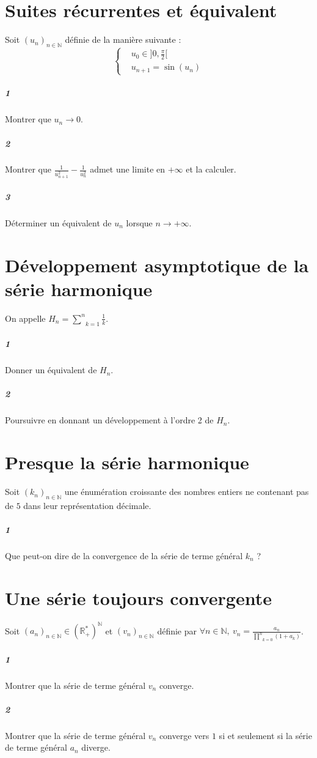 \documentclass[10pt,a4paper]{article}
\begin{document}
\section{Suites récurrentes et équivalent}
Soit $(u_n)_{n \in \mathbb{N}}$ définie de la manière suivante :
\begin{equation*}
\left\lbrace
\begin{aligned}
& u_0 \in ]0,\frac{\pi}{2}[\\
& u_{n+1}=\sin(u_n)
\end{aligned}
\right.
\end{equation*}
\subparagraph{1}Montrer que $u_n \rightarrow 0$.
\subparagraph{2}Montrer que $\frac{1}{u_{n+1}^2}-\frac{1}{u_n^2}$ admet une limite en $+\infty$ et la calculer.
\subparagraph{3}Déterminer un équivalent de $u_n$ lorsque $n \rightarrow +\infty$.

\section{Développement asymptotique de la série harmonique}
On appelle $H_n= \underset{k=1}{\overset{n}{\sum}}\frac{1}{k}$.
\subparagraph{1}Donner un équivalent de $H_n$.
\subparagraph{2}Poursuivre en donnant un développement à l'ordre 2 de $H_n$.

\section{Presque la série harmonique}
Soit $(k_n)_{n \in \mathbb{N}}$ une énumération croissante des nombres entiers ne contenant pas de $5$ dans leur représentation décimale.
\subparagraph{1}Que peut-on dire de la convergence de la série de terme général $k_n$ ?

\section{Une série toujours convergente}
Soit $(a_n)_{n \in \mathbb{N}} \in \left(\mathbb{R}_+^* \right)^{\mathbb{N}}$ et $(v_n)_{n \in \mathbb{N}}$ définie par ${ \forall n \in \mathbb{N}, \ v_n = \frac{a_n}{\underset{k=0}{\overset{n}{\prod}}(1+a_k)}}$.
\subparagraph{1}Montrer que la série de terme général $v_n$ converge.
\subparagraph{2}Montrer que la série de terme général $v_n$ converge vers $1$ si et seulement si la série de terme général $a_n$ diverge.
\end{document}
